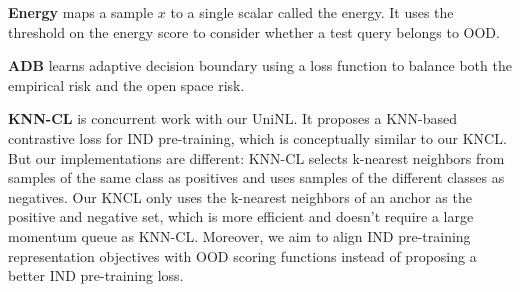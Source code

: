 \documentclass[11pt]{article}
\begin{document}
\noindent\textbf{Energy} \cite{ouyang-etal-2021-energy} maps a sample $x$ to a single scalar called the energy. It uses the threshold on the energy score to consider whether a test query belongs to OOD.

\noindent\textbf{ADB} \cite{Zhang2021DeepOI} learns adaptive decision boundary using a loss function to balance both the empirical risk and the open space risk.

\noindent\textbf{KNN-CL} \cite{zhou-etal-2022-knn} is concurrent work with our UniNL. It proposes a KNN-based contrastive loss for IND pre-training, which is conceptually similar to our KNCL. But our implementations are different: KNN-CL selects k-nearest neighbors from samples of the same class as positives and uses samples of the different classes as negatives. Our KNCL only uses the k-nearest neighbors of an anchor as the positive and negative set, which is more efficient and doesn't require a large momentum queue as KNN-CL. Moreover, we aim to align IND pre-training representation objectives with OOD scoring functions instead of proposing a better IND pre-training loss.
\end{document}
